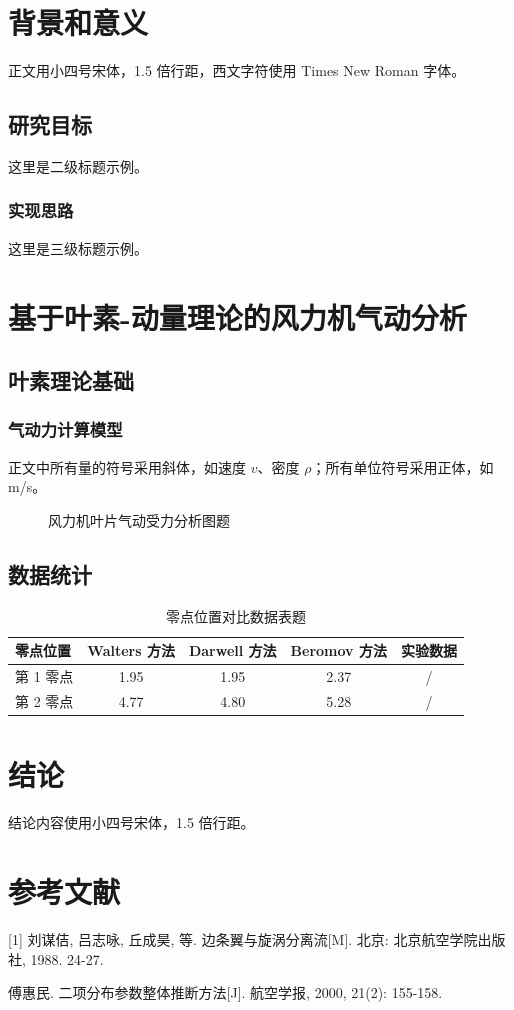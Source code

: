 \documentclass[12pt,a4paper,twoside,openany]{report}
\begin{document}




\cleardoublepage
{}

\chapter{背景和意义}
正文用小四号宋体，1.5 倍行距，西文字符使用 Times New Roman 字体。

\section{研究目标}
这里是二级标题示例。

\subsection{实现思路}
这里是三级标题示例。

\chapter{基于叶素-动量理论的风力机气动分析}
\section{叶素理论基础}
\subsection{气动力计算模型}
正文中所有量的符号采用斜体，如速度 $v$、密度 $\rho$；所有单位符号采用正体，如 m/s。

\begin{figure}[H]
	\centering
	\vspace{0.2cm}
	\caption{风力机叶片气动受力分析图题}
	\vspace{0.5\baselineskip}
\end{figure}

\section{数据统计}
\begin{table}[H]
	\centering
	\vspace{0.5\baselineskip}
	\caption{零点位置对比数据表题}
	\songti
	\begin{tabular}{lcccc}
		\toprule
		零点位置 & Walters 方法 & Darwell 方法 & Beromov 方法 & 实验数据 \\
		\midrule
		第 1 零点 & 1.95 & 1.95 & 2.37 & / \\
		第 2 零点 & 4.77 & 4.80 & 5.28 & / \\
		\bottomrule
	\end{tabular}
\end{table}

\chapter{结论}
结论内容使用小四号宋体，1.5 倍行距。

\chapter{参考文献}
{ \setlength{\baselineskip}{18pt}
[1] 刘谋佶, 吕志咏, 丘成昊, 等. 边条翼与旋涡分离流[M]. 北京: 北京航空学院出版社, 1988. 24-27. \par
[2] 傅惠民. 二项分布参数整体推断方法[J]. 航空学报, 2000, 21(2): 155-158. \par
}
\end{document}
